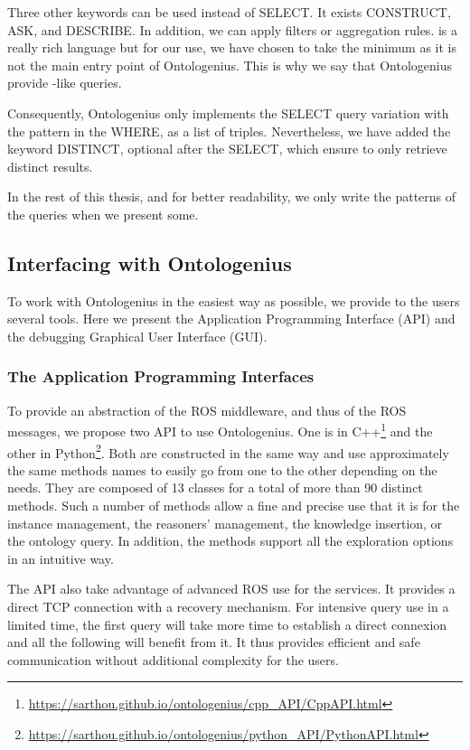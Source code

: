 Three other keywords can be used instead of SELECT. It exists CONSTRUCT, ASK, and DESCRIBE. In addition, we can apply filters or aggregation rules. \sparql{} is a really rich language but for our use, we have chosen to take the minimum as it is not the main entry point of Ontologenius. This is why we say that Ontologenius provide \sparql{}-like queries.

Consequently, Ontologenius only implements the SELECT query variation with the pattern in the WHERE, as a list of triples. Nevertheless, we have added the keyword DISTINCT, optional after the SELECT, which ensure to only retrieve distinct results.

In the rest of this thesis, and for better readability, we only write the patterns of the \sparql{} queries when we present some.

\subsection{Interfacing with Ontologenius}

To work with Ontologenius in the easiest way as possible, we provide to the users several tools. Here we present the Application Programming Interface (API) and the debugging Graphical User Interface (GUI).

\subsubsection{The Application Programming Interfaces}

To provide an abstraction of the ROS middleware, and thus of the ROS messages, we propose two API to use Ontologenius. One is in C++\footnote{\url{https://sarthou.github.io/ontologenius/cpp_API/CppAPI.html}} and the other in Python\footnote{\url{https://sarthou.github.io/ontologenius/python_API/PythonAPI.html}}. Both are constructed in the same way and use approximately the same methods names to easily go from one to the other depending on the needs. They are composed of 13 classes for a total of more than 90 distinct methods. Such a number of methods allow a fine and precise use that it is for the instance management, the reasoners' management, the knowledge insertion, or the ontology query. In addition, the methods support all the exploration options in an intuitive way.

The API also take advantage of advanced ROS use for the services. It provides a direct TCP connection with a recovery mechanism. For intensive query use in a limited time, the first query will take more time to establish a direct connexion and all the following will benefit from it. It thus provides efficient and safe communication without additional complexity for the users.

